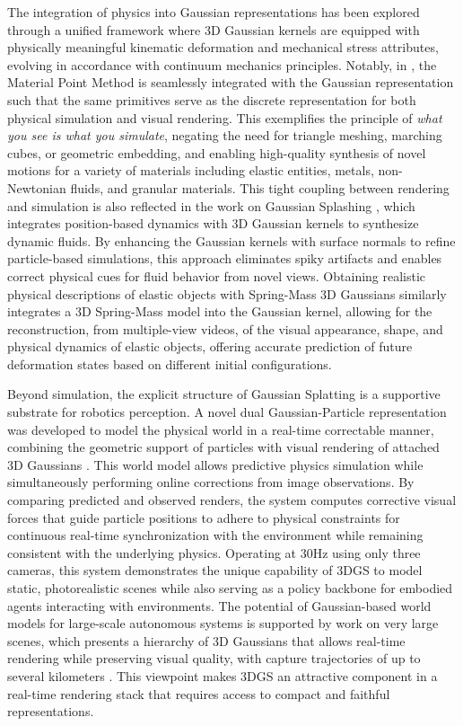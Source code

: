 \documentclass[11pt,a4paper]{article}
\begin{document}
The integration of physics into Gaussian representations has been explored through a unified framework where 3D Gaussian kernels are equipped with physically meaningful kinematic deformation and mechanical stress attributes, evolving in accordance with continuum mechanics principles. Notably, in \cite{arxiv:2311.12198v3}, the Material Point Method is seamlessly integrated with the Gaussian representation such that the same primitives serve as the discrete representation for both physical simulation and visual rendering. This exemplifies the principle of \emph{what you see is what you simulate}, negating the need for triangle meshing, marching cubes, or geometric embedding, and enabling high-quality synthesis of novel motions for a variety of materials including elastic entities, metals, non-Newtonian fluids, and granular materials. This tight coupling between rendering and simulation is also reflected in the work on Gaussian Splashing \cite{arxiv:2401.15318v1}, which integrates position-based dynamics with 3D Gaussian kernels to synthesize dynamic fluids. By enhancing the Gaussian kernels with surface normals to refine particle-based simulations, this approach eliminates spiky artifacts and enables correct physical cues for fluid behavior from novel views. Obtaining realistic physical descriptions of elastic objects with Spring-Mass 3D Gaussians \cite{arxiv:2403.09434v2} similarly integrates a 3D Spring-Mass model into the Gaussian kernel, allowing for the reconstruction, from multiple-view videos, of the visual appearance, shape, and physical dynamics of elastic objects, offering accurate prediction of future deformation states based on different initial configurations.

Beyond simulation, the explicit structure of Gaussian Splatting is a supportive substrate for robotics perception. A novel dual Gaussian-Particle representation was developed to model the physical world in a real-time correctable manner, combining the geometric support of particles with visual rendering of attached 3D Gaussians \cite{arxiv:2406.10788v1}. This world model allows predictive physics simulation while simultaneously performing online corrections from image observations. By comparing predicted and observed renders, the system computes corrective visual forces that guide particle positions to adhere to physical constraints for continuous real-time synchronization with the environment while remaining consistent with the underlying physics. Operating at 30Hz using only three cameras, this system demonstrates the unique capability of 3DGS to model static, photorealistic scenes while also serving as a policy backbone for embodied agents interacting with environments. The potential of Gaussian-based world models for large-scale autonomous systems is supported by work on very large scenes, which presents a hierarchy of 3D Gaussians that allows real-time rendering while preserving visual quality, with capture trajectories of up to several kilometers \cite{arxiv:2402.00525v1}. This viewpoint makes 3DGS an attractive component in a real-time rendering stack that requires access to compact and faithful representations.
\end{document}

